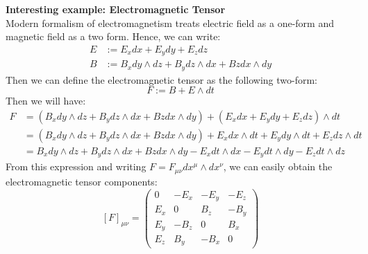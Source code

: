 \textbf{Interesting example: Electromagnetic Tensor}\\[0.2cm]
Modern formalism of electromagnetism treats electric field as a one-form and magnetic field as a two form. Hence, we can write:
\begin{align*}
    E&:= E_x dx + E_y dy + E_z dz\\
B&:= B_x dy\wedge dz + B_y dz\wedge dx + Bz dx\wedge dy
\end{align*}
Then we can define the electromagnetic tensor as the following two-form:
$$F:= B + E\wedge dt$$
Then we will have:
\begin{align*}
    F &= (B_x dy\wedge dz + B_y dz\wedge dx + Bz dx\wedge dy) + (E_x dx + E_y dy + E_z dz)\wedge dt\\
    &=(B_x dy\wedge dz + B_y dz\wedge dx + Bz dx\wedge dy) + E_x dx\wedge dt +E_y dy\wedge dt+E_z dz\wedge dt\\
    &=B_x dy\wedge dz + B_y dz\wedge dx+Bz dx\wedge dy - E_x dt\wedge dx -E_y dt\wedge dy -E_z dt\wedge dz
\end{align*}
From this expression and writing $F = F_{\mu\nu}dx^\mu\wedge dx^\nu$, we can easily obtain the electromagnetic tensor components:
\[
[F]_{\mu\nu} =
\begin{pmatrix}
0 & -E_x & -E_y & -E_z \\
E_x & 0 & B_z & -B_y \\
E_y & -B_z & 0 & B_x \\
E_z & B_y & -B_x & 0
\end{pmatrix}
\]